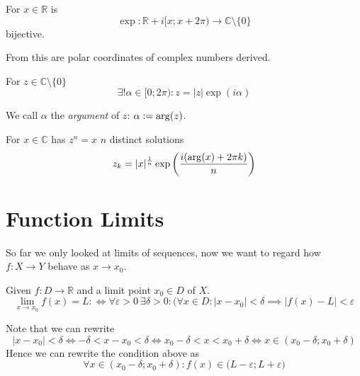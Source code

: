 \begin{theorem}
   For \(x \in \mathbb{R}\) is
   \[\exp: \mathbb{R} + i[x; x + 2\pi) \to \mathbb{C}\setminus\{0\}\]
   bijective.
\end{theorem}
\begin{remark}
   From this are polar coordinates of complex numbers derived.
\end{remark}

\begin{theorem}
   For \(z \in \mathbb{C}\setminus\{0\}\)
   \[\exists! \alpha \in [0; 2\pi): z = \lvert z\rvert \exp(i \alpha)\]
\end{theorem}
\begin{remark}
   We call \(\alpha\) the \emph{argument} of \(z\): \(\alpha := \operatorname{arg}(z)\).
\end{remark}

\begin{theorem}
   For \(x \in \mathbb{C}\) has \(z^n = x\) \(n\) distinct solutions
   \[z_k = \lvert x\rvert^\frac{1}{n} \exp\left(\frac{i(\operatorname{arg}(x) + 2\pi k)}{n}\right)\]
\end{theorem}


\newpage

\section{Function Limits}
So far we only looked at limits of sequences, now we want to regard how \(f: X \to Y\) behave as \(x \to x_0\).

\begin{definition}\label{def:func_limit}
   Given \(f: D \to \mathbb{R}\) and a limit point \(x_0 \in D\) of \(X\).
   \[\lim_{x \to x_0} f(x) = L :\iff \forall \varepsilon > 0~\exists \delta > 0: (\forall x \in D: \lvert x - x_0 \rvert < \delta \implies \lvert f(x) - L\rvert < \varepsilon\]
\end{definition}
\begin{remark}[Intuition]
   Note that we can rewrite
   \[\lvert x - x_0\rvert < \delta \iff -\delta < x - x_0 < \delta \iff x_0 - \delta < x < x_0 + \delta \iff x \in (x_0 - \delta; x_0 + \delta)\]
   Hence we can rewrite the condition above as
   \[\forall x \in (x_0 - \delta; x_0 + \delta): f(x) \in \big(L - \varepsilon; L + \varepsilon\big)\]
\end{remark}

\begin{center}
   
\end{center}

